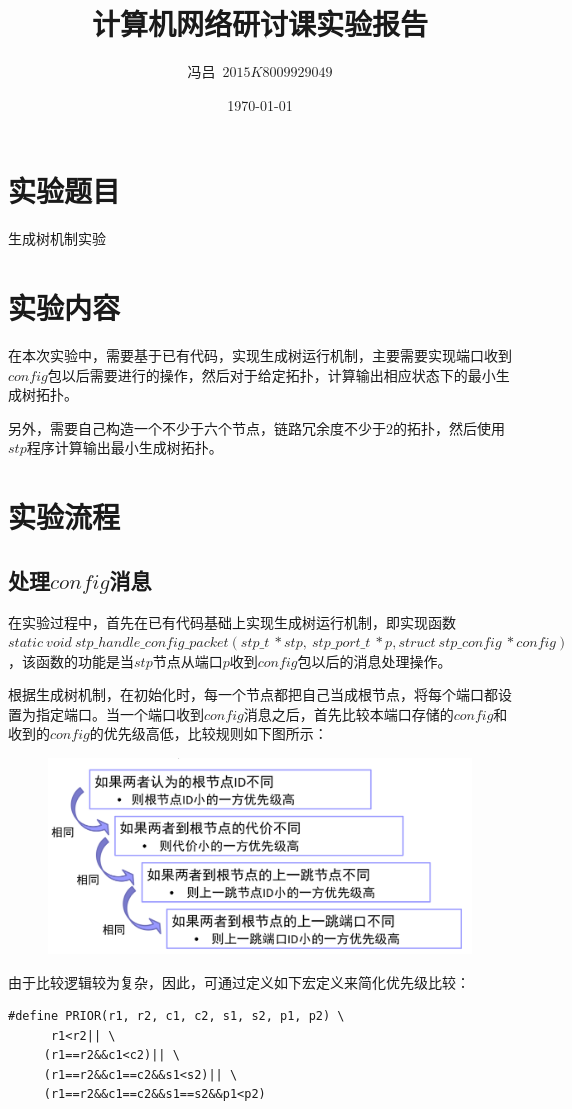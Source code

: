 \documentclass[UTF8,noindent]{ctexart}
\title{\CJKfamily{zhkai}计算机网络研讨课实验报告}
\author{{\CJKfamily{zhkai}冯吕}\ $2015K8009929049$}
\date{\today}
\begin{document}
\maketitle
{}
\section*{{实验题目}}生成树机制实验
\section*{{实验内容}}
在本次实验中，需要基于已有代码，实现生成树运行机制，主要需要实现端口收到$config$包以后需要进行的操作，然后对于给定拓扑，计算输出相应状态下的最小生成树拓扑。

另外，需要自己构造一个不少于六个节点，链路冗余度不少于$2$的拓扑，然后使用$stp$程序计算输出最小生成树拓扑。
\section*{{实验流程}}

\subsection*{处理$config$消息}
在实验过程中，首先在已有代码基础上实现生成树运行机制，即实现函数$static\ void\ stp\_handle\_config\_packet(stp\_t\ *stp,\ stp\_port\_t\ *p, struct\ stp\_config\ *config)$，该函数的功能是当$stp$节点从端口$p$收到$config$包以后的消息处理操作。

根据生成树机制，在初始化时，每一个节点都把自己当成根节点，将每个端口都设置为指定端口。当一个端口收到$config$消息之后，首先比较本端口存储的$config$和收到的$config$的优先级高低，比较规则如下图所示：
\begin{figure}[H]
  \centering
  \includegraphics[scale=0.3]{cmp.png}
\end{figure}
由于比较逻辑较为复杂，因此，可通过定义如下宏定义来简化优先级比较：
\begin{lstlisting}
#define PRIOR(r1, r2, c1, c2, s1, s2, p1, p2) \
      r1<r2|| \
     (r1==r2&&c1<c2)|| \
     (r1==r2&&c1==c2&&s1<s2)|| \
     (r1==r2&&c1==c2&&s1==s2&&p1<p2)
\end{lstlisting}
\end{document}

